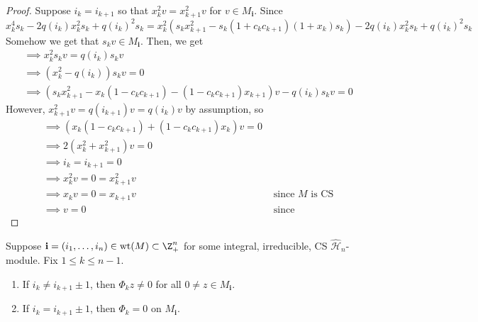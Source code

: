 \documentclass[11pt,leqno,oneside]{amsbook}
\renewcommand{\H}{\mathcal{H}}
\DeclareMathOperator{\wt}{wt}
\renewcommand{\vec}[1]{\mathbf{#1}}
\numberwithin{thm}{section}
\begin{document}
\begin{proof}
  Suppose \(i_k = i_{k+1}\) so that \(x_k^2 v = x_{k+1}^2 v\) for \(v \in 
  M_{\vec{i}}\). Since \[
    x_k^4 s_k - 2 q(i_k) x_k^2 s_k  + q(i_k)^2 s_k  = x_k^2 (s_k
    x_{k+1}^2 - s_k(1+c_k c_{k+1})(1+x_k)s_k) - 2 q(i_k) x_k^2 s_k +
    q(i_k)^2 s_k
  \]
  Somehow we get  that \(s_k v \in
  M_{\vec{i}}\). Then, we get
  \begin{align*}
    & \implies x_k^2 s_k v = q(i_k)s_k v\\
    & \implies (x_k^2 - q(i_k))s_k v = 0 \\
    & \implies (s_k x_{k+1}^2 - x_k(1-c_k c_{k+1}) - (1-c_k
      c_{k+1})x_{k+1})v-q(i_k)s_k v = 0
  \end{align*}
  However, \(x_{k+1}^2 v = q(i_{k+1})v = q(i_k)v\) by assumption, so
  \begin{align*}
    & \implies (x_k(1-c_k c_{k+1})+(1-c_k c_{k+1})x_k)v = 0 \\
    & \implies 2(x_k^2+x_{k+1}^2) v = 0 \\
    & \implies i_k = i_{k+1} = 0\\
    & \implies x_k^2 v = 0 = x_{k+1}^2 v\\
    & \implies x_k v = 0 = x_{k+1}v & \text{ since }M\text{ is CS}\\
    & \implies v = 0 & \text{ since }
  \end{align*}
\end{proof}
\begin{lem}\label{integer-step-lemma}
  Suppose \(\vec{i} = (i_1, \ldots, i_n) \in \wt(M) \subset \Z_+^n\)
  for some integral, irreducible, CS \(\hat{\H}_n\)-module. Fix \(1
  \leq k \leq n-1\).
  \begin{enumerate}
  \item If \(i_k \neq i_{k+1}\pm 1\), then \(\Phi_k z \neq 0\) for all
    \(0 \neq z \in M_{\vec{i}}\).
  \item If \(i_k = i_{k+1} \pm 1\), then \(\Phi_k = 0\) on
    \(M_{\vec{i}}\). 
  \end{enumerate}
\end{lem}
\end{document}
